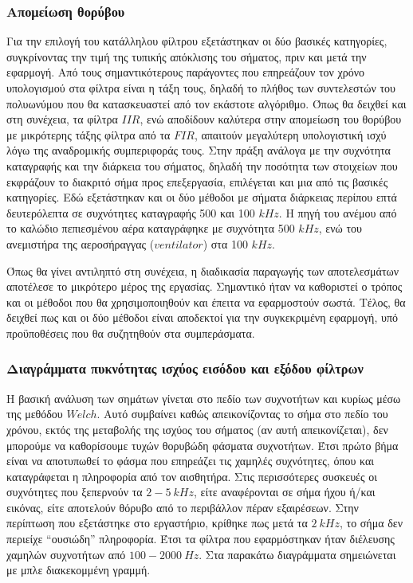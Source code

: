 \documentclass[breaklines=true, 12pt]{article}
\begin{document}
{{{\subsubsection{Απομείωση θορύβου}
\label{sec:org5984d20}
Για την επιλογή του κατάλληλου φίλτρου εξετάστηκαν οι δύο βασικές
κατηγορίες, συγκρίνοντας την τιμή της τυπικής απόκλισης του σήματος, πριν
και μετά την εφαρμογή.  Από τους σημαντικότερους παράγοντες
που επηρεάζουν τον χρόνο υπολογισμού στα φίλτρα είναι η τάξη τους, δηλαδή
το πλήθος των συντελεστών του πολυωνύμου που θα κατασκευαστεί από τον
εκάστοτε αλγόριθμο. Όπως θα δειχθεί και στη συνέχεια, τα φίλτρα \(IIR\), ενώ
αποδίδουν καλύτερα στην απομείωση του θορύβου με μικρότερης τάξης φίλτρα
από τα \(FIR\), απαιτούν μεγαλύτερη υπολογιστική ισχύ λόγω της αναδρομικής
συμπεριφοράς τους. Στην πράξη ανάλογα με την συχνότητα καταγραφής και
την διάρκεια του σήματος, δηλαδή την ποσότητα των στοιχείων που εκφράζουν
το διακριτό σήμα προς επεξεργασία, επιλέγεται και μια από τις βασικές
κατηγορίες. Εδώ εξετάστηκαν και οι δύο μέθοδοι με σήματα διάρκειας περίπου
επτά δευτερόλεπτα σε συχνότητες καταγραφής 500 και 100 \(kHz\). Η πηγή του
ανέμου από το καλώδιο πεπιεσμένου αέρα καταγράφηκε με συχνότητα 500 \(kHz\),
ενώ του ανεμιστήρα της αεροσήραγγας (\textbf{\(ventilator\)}) στα 100 \(kHz\).

Όπως θα γίνει αντιληπτό στη συνέχεια, η διαδικασία παραγωγής των αποτελεσμάτων
αποτέλεσε το μικρότερο μέρος της εργασίας. Σημαντικό ήταν να καθοριστεί ο
τρόπος και οι μέθοδοι που θα χρησιμοποιηθούν και έπειτα να εφαρμοστούν
σωστά. Τέλος, θα δειχθεί πως και οι δύο μέθοδοι είναι αποδεκτοί για την
συγκεκριμένη εφαρμογή, υπό προϋποθέσεις που θα συζητηθούν στα συμπεράσματα.
\subsubsection{Διαγράμματα πυκνότητας ισχύος εισόδου και εξόδου φίλτρων}
\label{sec:orgd474e5c}
Η βασική ανάλυση των σημάτων γίνεται στο πεδίο των συχνοτήτων και κυρίως
μέσω της μεθόδου \(Welch\). Αυτό συμβαίνει
καθώς απεικονίζοντας το σήμα στο πεδίο του χρόνου, εκτός της μεταβολής της
ισχύος του σήματος (αν αυτή απεικονίζεται), δεν μπορούμε να καθορίσουμε
τυχών θορυβώδη φάσματα συχνοτήτων. Έτσι πρώτο βήμα είναι να αποτυπωθεί το
φάσμα που επηρεάζει τις χαμηλές συχνότητες, όπου και καταγράφεται η
πληροφορία από τον αισθητήρα. Στις περισσότερες συσκευές οι συχνότητες
που ξεπερνούν τα \(2-5\ kHz\), είτε αναφέρονται σε σήμα ήχου ή/και εικόνας,
είτε αποτελούν θόρυβο από το περιβάλλον πέραν εξαιρέσεων. Στην περίπτωση
που εξετάστηκε στο εργαστήριο, κρίθηκε πως μετά τα \(2\ kHz\), το σήμα δεν
περιείχε “ουσιώδη” πληροφορία. Έτσι τα φίλτρα που εφαρμόστηκαν ήταν διέλευσης
χαμηλών συχνοτήτων από \(100-2000\ Hz\).  Στα παρακάτω διαγράμματα σημειώνεται
με μπλε διακεκομμένη γραμμή.

}}}
\end{document}
